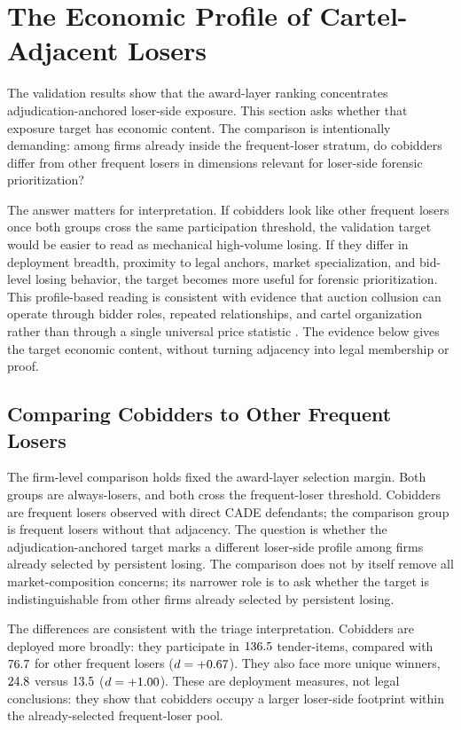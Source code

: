 \section{The Economic Profile of Cartel-Adjacent Losers}
\label{sec:cobidder_type}

The validation results show that the award-layer ranking
concentrates adjudication-anchored loser-side exposure. This
section asks whether that exposure target has economic content.
The comparison is intentionally demanding: among firms already
inside the frequent-loser stratum, do cobidders differ from
other frequent losers in dimensions relevant for loser-side
forensic prioritization?

The answer matters for interpretation. If cobidders look like
other frequent losers once both groups cross the same
participation threshold, the validation target would be easier
to read as mechanical high-volume losing. If they differ in
deployment breadth, proximity to legal anchors, market
specialization, and bid-level losing behavior, the target becomes
more useful for forensic prioritization. This profile-based
reading is consistent with evidence that auction collusion can
operate through bidder roles, repeated relationships, and cartel
organization rather than through a single universal price
statistic
\citep{baldwin1997bidder,porter1999ohio,pesendorfer2000study,asker2010leniency,clark2021collusion}.
The evidence below gives the target economic content, without
turning adjacency into legal membership or proof.

\subsection{Comparing Cobidders to Other Frequent Losers}
\label{sec:cobidder_firm}

The firm-level comparison holds fixed the award-layer selection
margin. Both groups are always-losers, and both cross the
frequent-loser threshold. Cobidders are frequent losers observed
with direct CADE defendants; the comparison group is frequent
losers without that adjacency. The question is whether the
adjudication-anchored target marks a different loser-side
profile among firms already selected by persistent losing.
The comparison does not by itself remove all market-composition
concerns; its narrower role is to ask whether the target is
indistinguishable from other firms already selected by persistent
losing.

The differences are consistent with the triage interpretation.
Cobidders are deployed more broadly: they participate in
$136.5$ tender-items, compared with
$76.7$ for other frequent losers
($d=+0.67$). They also face more unique winners,
$24.8$ versus $13.5$
($d=+1.00$). These are deployment measures, not
legal conclusions: they show that cobidders occupy a larger
loser-side footprint within the already-selected frequent-loser
pool.


